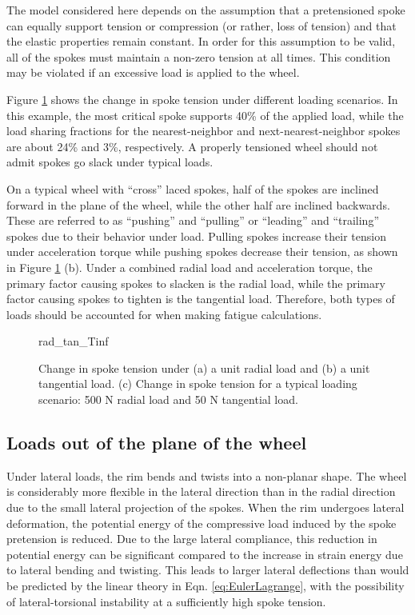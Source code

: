 \documentclass[\rootdir/thesis.tex]{subfiles}
\begin{document}
The model considered here depends on the assumption that a pretensioned spoke can equally support tension or compression (or rather, loss of tension) and that the elastic properties remain constant. In order for this assumption to be valid, all of the spokes must maintain a non-zero tension at all times. This condition may be violated if an excessive load is applied to the wheel.

Figure \ref{fig:radtan_Tinf} shows the change in spoke tension under different loading scenarios. In this example, the most critical spoke supports 40\% of the applied load, while the load sharing fractions for the nearest-neighbor and next-nearest-neighbor spokes are about 24\% and 3\%, respectively. A properly tensioned wheel should not admit spokes go slack under typical loads.

On a typical wheel with ``cross'' laced spokes, half of the spokes are inclined forward in the plane of the wheel, while the other half are inclined backwards. These are referred to as ``pushing'' and ``pulling'' or ``leading'' and ``trailing'' spokes due to their behavior under load. Pulling spokes increase their tension under acceleration torque while pushing spokes decrease their tension, as shown in Figure \ref{fig:radtan_Tinf} (b). Under a combined radial load and acceleration torque, the primary factor causing spokes to slacken is the radial load, while the primary factor causing spokes to tighten is the tangential load. Therefore, both types of loads should be accounted for when making fatigue calculations.

\begin{figure}
\centering
{rad_tan_Tinf}
\caption{Change in spoke tension under (a) a unit radial load and (b) a unit tangential load. (c) Change in spoke tension for a typical loading scenario: 500 N radial load and 50 N tangential load.}
\label{fig:radtan_Tinf}
\end{figure}

\subsection{Loads out of the plane of the wheel}

Under lateral loads, the rim bends and twists into a non-planar shape. The wheel is considerably more flexible in the lateral direction than in the radial direction due to the small lateral projection of the spokes. When the rim undergoes lateral deformation, the potential energy of the compressive load induced by the spoke pretension is reduced. Due to the large lateral compliance, this reduction in potential energy can be significant compared to the increase in strain energy due to lateral bending and twisting. This leads to larger lateral deflections than would be predicted by the linear theory in Eqn. \eqref{eq:EulerLagrange}, with the possibility of lateral-torsional instability at a sufficiently high spoke tension.
\end{document}
